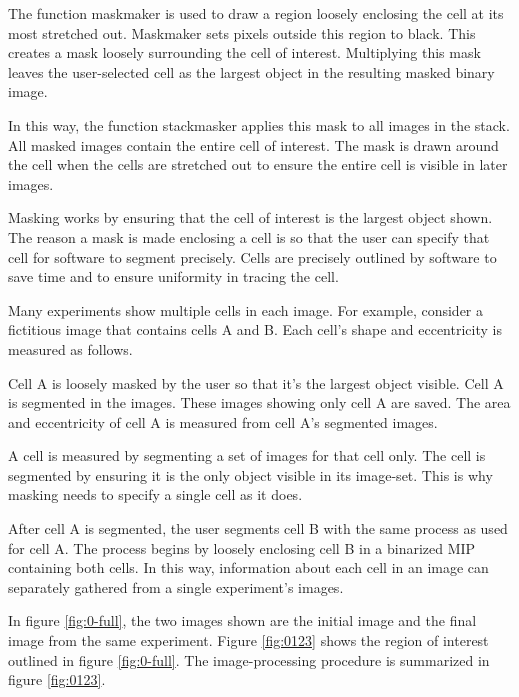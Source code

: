 \documentclass[ twocolumn,notitlepage]{ revtex4-1}
\begin{document}
The function maskmaker is used to draw a region loosely enclosing the cell at its most stretched out. Maskmaker sets pixels outside this region to black. This creates a mask loosely surrounding the cell of interest. Multiplying this mask leaves the user-selected cell as the largest object in the resulting masked binary image.

In this way, the function stackmasker applies this mask to all images in the stack. All masked images contain the entire cell of interest. The mask is drawn around the cell when the cells are stretched out to ensure the entire cell is visible in later images.

Masking works by ensuring that the cell of interest is the largest object shown. The reason a mask is made enclosing a cell is so that the user can specify that cell for software to segment precisely. Cells are precisely outlined by software to save time and to ensure uniformity in tracing the cell.

Many experiments show multiple cells in each image. For example, consider a fictitious image that contains cells A and B. Each cell's shape and eccentricity is measured as follows.

Cell A is loosely masked by the user so that it's the largest object visible. Cell A is segmented in the images. These images showing only cell A are saved. The area and eccentricity of cell A is measured from cell A's segmented images.

A cell is measured by segmenting a set of images for that cell only. The cell is segmented by ensuring it is the only object visible in its image-set. This is why masking needs to specify a single cell as it does.

After cell A is segmented, the user segments cell B with the same process as used for cell A. The process begins by loosely enclosing cell B in a binarized MIP containing both cells. In this way, information about each cell in an image can separately gathered from a single experiment's images.

In figure \ref{fig:0-full}, the two images shown are the initial image and the final image from the same experiment. Figure \ref{fig:0123} shows the region of interest outlined in figure \ref{fig:0-full}. The image-processing procedure is summarized in figure \ref{fig:0123}. 
\end{document}
